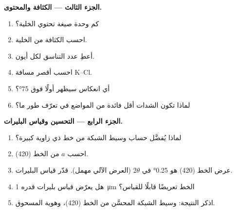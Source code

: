 \begin{problem}
\medskip\noindent\textbf{الجزء الثالث --- الكثافة والمحتوى.}
\begin{enumerate}[resume]
  \item كم وحدة صيغة تحتوي الخلية؟
  \item احسب الكثافة من الخلية.
  \item أعطِ عدد التناسق لكل أيون.
  \item احسب أقصر مسافة K--Cl.
  \item أي انعكاس سيظهر أولًا فوق \ang{75}؟
  \item لماذا تكون الشدات أقل فائدة من المواضع في تعرّف طور ما؟
\end{enumerate}

\medskip\noindent\textbf{الجزء الرابع --- التحسين وقياس البليرات.}
\begin{enumerate}[resume]
  \item لماذا يُفضَّل حساب وسيط الشبكة من خط ذي زاوية كبيرة؟
  \item احسب $a$ من الخط (420).
  \item عرض الخط (420) هو \ang{0.25} في $2\theta$ (العرض الآلي
        مهمل). قدّر قياس البليرات.
  \item هل يعرّض قياس بليرات قدره \qty{1}{\micro m} الخط تعريضًا قابلًا للقياس؟
  \item اذكر النتيجة: وسيط الشبكة المحسَّن من الخط (420)، 
        وهوية المسحوق.
\end{enumerate}
\end{problem}
